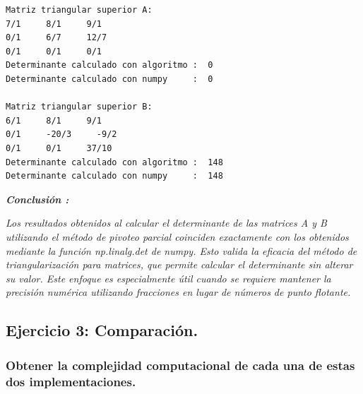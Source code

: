 \documentclass[11pt]{article}
\begin{document}
    \begin{Verbatim}[commandchars=\\\{\}]
Matriz triangular superior A:
7/1     8/1     9/1
0/1     6/7     12/7
0/1     0/1     0/1
Determinante calculado con algoritmo :  0
Determinante calculado con numpy     :  0

Matriz triangular superior B:
6/1     8/1     9/1
0/1     -20/3     -9/2
0/1     0/1     37/10
Determinante calculado con algoritmo :  148
Determinante calculado con numpy     :  148
    \end{Verbatim}

    \textbf{\textbf{\emph{Conclusión :}}}

    \emph{Los resultados obtenidos al calcular el determinante de las
matrices A y B utilizando el método de pivoteo parcial coinciden
exactamente con los obtenidos mediante la función np.linalg.det de
numpy. Esto valida la eficacia del método de triangularización para
matrices, que permite calcular el determinante sin alterar su valor.
Este enfoque es especialmente útil cuando se requiere mantener la
precisión numérica utilizando fracciones en lugar de números de punto
flotante.}

    \subsection{Ejercicio 3:
Comparación.}\label{ejercicio-3-comparaciuxf3n.}

\subsubsection{Obtener la complejidad computacional de cada una de estas
dos
implementaciones.}\label{obtener-la-complejidad-computacional-de-cada-una-de-estas-dos-implementaciones.}
\end{document}
